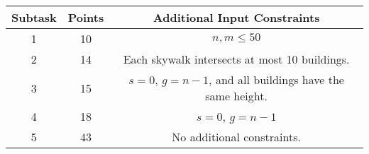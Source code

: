 \begin{center}
\renewcommand{\arraystretch}{1.5}
\begin{tabular}{|c|c|c|}
\hline
Subtask & Points & Additional Input Constraints\\
\hline
1 & 10 & $n, m \leq 50$ \\
\hline
2 & 14 & Each skywalk intersects at most 10 buildings. \\
\hline
3 & 15 & $s=0$, $g=n-1$, and all buildings have the same height. \\
\hline
4 & 18 & $s=0$, $g=n-1$ \\
\hline
5 & 43 & No additional constraints. \\
\hline
\hline
\end{tabular}
\end{center}